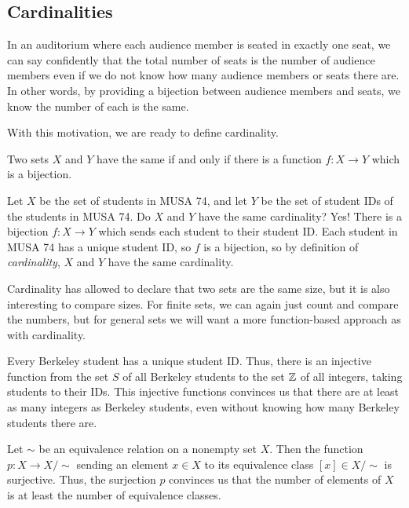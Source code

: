 \documentclass[../notes.tex]{subfiles}
\begin{document}
\subsection{Cardinalities}
In an auditorium where each audience member is seated in exactly one seat, we can say confidently that the total number of seats is the number of audience members even if we do not know how many audience members or seats there are. In other words, by providing a bijection between audience members and seats, we know the number of each is the same.

With this motivation, we are ready to define cardinality.
\begin{definition}[cardinality]
    Two sets $X$ and $Y$ have the same  if and only if there is a function $f\colon X \to Y$ which is a bijection.
\end{definition}
\begin{example}
    Let $X$ be the set of students in MUSA 74, and let $Y$ be the set of student IDs of the students in MUSA 74. Do $X$ and $Y$ have the same cardinality? Yes! There is a bijection $f\colon X \to Y$ which sends each student to their student ID. Each student in MUSA 74 has a unique student ID, so $f$ is a bijection, so by definition of \textit{cardinality}, $X$ and $Y$ have the same cardinality.
\end{example}
Cardinality has allowed to declare that two sets are the same size, but it is also interesting to compare sizes. For finite sets, we can again just count and compare the numbers, but for general sets we will want a more function-based approach as with cardinality.
\begin{example}
    Every Berkeley student has a unique student ID. Thus, there is an injective function from the set $S$ of all Berkeley students to the set $\mathbb Z$ of all integers, taking students to their IDs. This injective functions convinces us that there are at least as many integers as Berkeley students, even without knowing how many Berkeley students there are.
\end{example}
\begin{example} \label{ex:surj-compares-cards}
    Let $\sim$ be an equivalence relation on a nonempty set $X$. Then the function $p\colon X\to X/{\sim}$ sending an element $x\in X$ to its equivalence class $[x]\in X/{\sim}$ is surjective. Thus, the surjection $p$ convinces us that the number of elements of $X$ is at least the number of equivalence classes.
\end{example}
\end{document}
